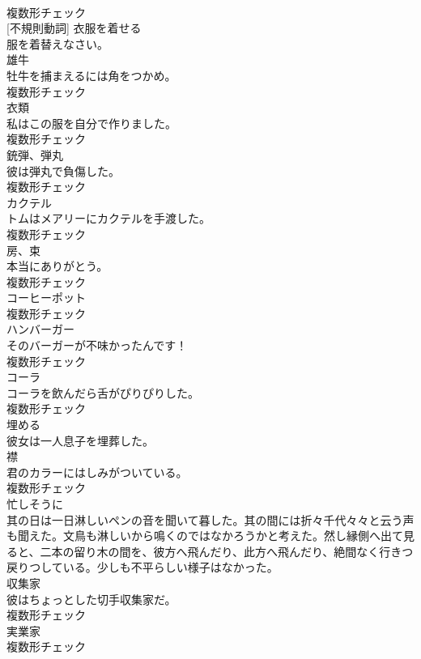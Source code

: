 \documentclass[8pt]{extreport}
\begin{document}
\begin{CJK}{UTF8}{min}
\\	複数形チェック
\\	[動詞] [不規則動詞]	衣服を着せる	
\\	服を着替えなさい。	
\\	[名詞]	雄牛	
\\	牡牛を捕まえるには角をつかめ。	
\\	複数形チェック
\\	[名詞]	衣類	
\\	私はこの服を自分で作りました。	
\\	複数形チェック
\\	[名詞]	銃弾、弾丸	
\\	彼は弾丸で負傷した。	
\\	複数形チェック
\\	[名詞]	カクテル	
\\	トムはメアリーにカクテルを手渡した。	
\\	複数形チェック
\\	[名詞]	房、束	
\\	本当にありがとう。	
\\	複数形チェック
\\	[名詞]	コーヒーポット	
\\	複数形チェック
\\	[名詞]	ハンバーガー	
\\	そのバーガーが不味かったんです！	
\\	複数形チェック
\\	[名詞]	コーラ	
\\	コーラを飲んだら舌がぴりぴりした。	
\\	複数形チェック
\\	[動詞]	埋める	
\\	彼女は一人息子を埋葬した。	
\\	[名詞]	襟	
\\	君のカラーにはしみがついている。	
\\	複数形チェック
\\	[副詞]	忙しそうに	
\\	其の日は一日淋しいペンの音を聞いて暮した。其の間には折々千代々々と云う声も聞えた。文鳥も淋しいから鳴くのではなかろうかと考えた。然し縁側へ出て見ると、二本の留り木の間を、彼方へ飛んだり、此方へ飛んだり、絶間なく行きつ戻りつしている。少しも不平らしい様子はなかった。	
\\	[名詞]	収集家	
\\	彼はちょっとした切手収集家だ。	
\\	複数形チェック
\\	[名詞]	実業家	
\\	複数形チェック

\end{CJK}
\end{document}
